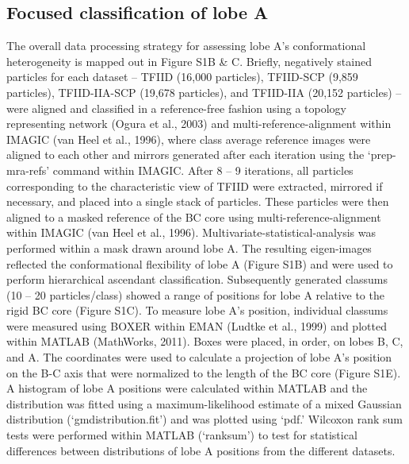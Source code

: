 \subsection{Focused classification of lobe A}
The overall data processing strategy for assessing lobe A’s conformational heterogeneity is mapped out in Figure S1B & C.  Briefly, negatively stained particles for each dataset – TFIID (16,000 particles), TFIID-SCP (9,859 particles), TFIID-IIA-SCP (19,678 particles), and TFIID-IIA (20,152 particles) – were aligned and classified in a reference-free fashion using a topology representing network (Ogura et al., 2003) and multi-reference-alignment within IMAGIC (van Heel et al., 1996), where class average reference images were aligned to each other and mirrors generated after each iteration using the ‘prep-mra-refs’ command within IMAGIC.  After 8 – 9 iterations, all particles corresponding to the characteristic view of TFIID were extracted, mirrored if necessary, and placed into a single stack of particles.  These particles were then aligned to a masked reference of the BC core using multi-reference-alignment within IMAGIC (van Heel et al., 1996).  Multivariate-statistical-analysis was performed within a mask drawn around lobe A.  The resulting eigen-images reflected the conformational flexibility of lobe A (Figure S1B) and were used to perform hierarchical ascendant classification.  Subsequently generated classums (10 – 20 particles/class) showed a range of positions for lobe A relative to the rigid BC core (Figure S1C).
	To measure lobe A’s position, individual classums were measured using BOXER within EMAN (Ludtke et al., 1999) and plotted within MATLAB (MathWorks, 2011).  Boxes were placed, in order, on lobes B, C, and A.  The coordinates were used to calculate a projection of lobe A’s position on the B-C axis that were normalized to the length of the BC core (Figure S1E).  A histogram of lobe A positions were calculated within MATLAB and the distribution was fitted using a maximum-likelihood estimate of a mixed Gaussian distribution (‘gmdistribution.fit’) and was plotted using ‘pdf.’  Wilcoxon rank sum tests were performed within MATLAB (‘ranksum’) to test for statistical differences between distributions of lobe A positions from the different datasets.


